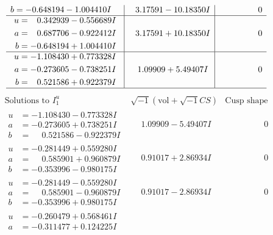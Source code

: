 \documentclass[1p]{elsarticle_modified}
\theoremstyle{definition}
\newcommand{\I}{\sqrt{-1}}
\begin{document}
$$\begin{array}{c|c|c}
\begin{aligned}
b &= -0.648194 - 1.004410 I\end{aligned}
 & \phantom{-}3.17591 - 10.18350 I & \phantom{-0.000000 } 0 \\ \hline\begin{aligned}
u &= \phantom{-}0.342939 - 0.556689 I \\
a &= \phantom{-}0.687706 - 0.922412 I \\
b &= -0.648194 + 1.004410 I\end{aligned}
 & \phantom{-}3.17591 + 10.18350 I & \phantom{-0.000000 } 0 \\ \hline\begin{aligned}
u &= -1.108430 + 0.773328 I \\
a &= -0.273605 - 0.738251 I \\
b &= \phantom{-}0.521586 + 0.922379 I\end{aligned}
 & \phantom{-}1.09909 + 5.49407 I & \phantom{-0.000000 } 0\\
 \hline 
 \end{array}$$\newpage$$\begin{array}{c|c|c}  
\text{Solutions to }I^u_{1}& \I (\text{vol} + \sqrt{-1}CS) & \text{Cusp shape}\\
 \hline 
\begin{aligned}
u &= -1.108430 - 0.773328 I \\
a &= -0.273605 + 0.738251 I \\
b &= \phantom{-}0.521586 - 0.922379 I\end{aligned}
 & \phantom{-}1.09909 - 5.49407 I & \phantom{-0.000000 } 0 \\ \hline\begin{aligned}
u &= -0.281449 + 0.559280 I \\
a &= \phantom{-}0.585901 + 0.960879 I \\
b &= -0.353996 - 0.980175 I\end{aligned}
 & \phantom{-}0.91017 + 2.86934 I & \phantom{-0.000000 } 0 \\ \hline\begin{aligned}
u &= -0.281449 - 0.559280 I \\
a &= \phantom{-}0.585901 - 0.960879 I \\
b &= -0.353996 + 0.980175 I\end{aligned}
 & \phantom{-}0.91017 - 2.86934 I & \phantom{-0.000000 } 0 \\ \hline\begin{aligned}
u &= -0.260479 + 0.568461 I \\
a &= -0.311477 + 0.124225 I \\

\end{aligned}
\end{array}$$
\end{document}
